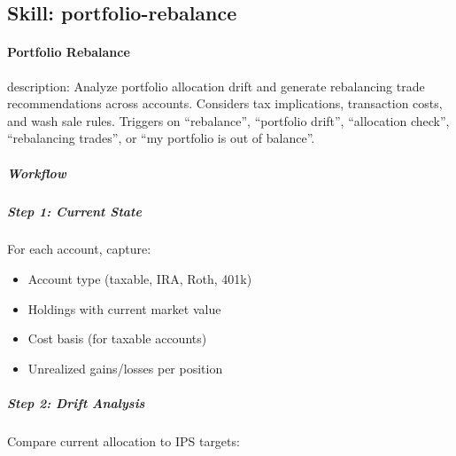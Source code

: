 \documentclass[11pt]{article}
\begin{document}
\subsection{Skill: portfolio-rebalance}\label{file:skills-portfolio-rebalance-SKILL.md}

\paragraph{Portfolio Rebalance}\mbox{}\par

description: Analyze portfolio allocation drift and generate rebalancing trade recommendations across accounts. Considers tax implications, transaction costs, and wash sale rules. Triggers on ``rebalance'', ``portfolio drift'', ``allocation check'', ``rebalancing trades'', or ``my portfolio is out of balance''.


\subparagraph{Workflow}\mbox{}\par

\subparagraph{Step 1: Current State}\mbox{}\par

For each account, capture:

\begin{itemize}[leftmargin=*,itemsep=2pt,topsep=2pt]
\item {} Account type (taxable, IRA, Roth, 401k)
\item {} Holdings with current market value
\item {} Cost basis (for taxable accounts)
\item {} Unrealized gains/losses per position
\end{itemize}

\subparagraph{Step 2: Drift Analysis}\mbox{}\par

Compare current allocation to IPS targets:
\end{document}
